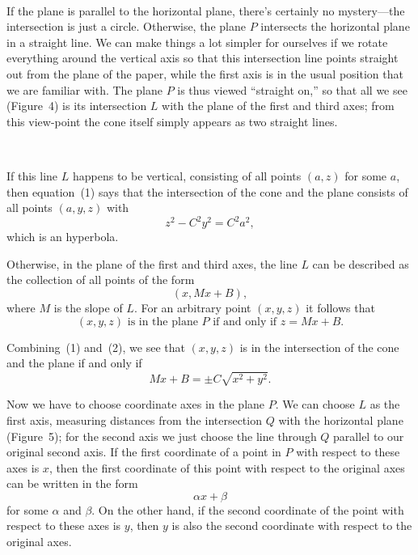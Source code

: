 \begin{center}
\\[0.6em]
\end{center}

If the plane is parallel to the horizontal plane, there's certainly no
mystery---the intersection is just a circle. Otherwise, the plane $P$
intersects the horizontal plane in a straight line. We can make things a lot
simpler for ourselves if we rotate everything around the vertical axis so that
this intersection line points straight out from the plane of the paper, while
the first axis is in the usual position that we are familiar with. The plane
$P$ is thus viewed ``straight on,'' so that all we see (Figure~4) is its
intersection $L$ with the plane of the first and third axes; from this
view-point the cone itself simply appears as two straight lines.

\begin{center}
\\[0.6em]
\end{center}

If this line $L$ happens to be vertical, consisting of all points $(a,z)$ for
some $a$, then equation~(1) says that the intersection of the cone and the
plane consists of all points $(a,y,z)$ with
\[
z^2-C^2y^2=C^2a^2,
\]
which is an hyperbola.

Otherwise, in the plane of the first and third axes, the line $L$ can be
described as the collection of all points of the form
\[
(x,Mx+B),
\]
where $M$ is the slope of $L$. For an arbitrary point $(x,y,z)$ it follows that
\begin{equation}
(x,y,z)\text{ is in the plane }P\text{ if and only if }z=Mx+B.\tag{2}
\end{equation}

Combining~(1) and~(2), we see that $(x,y,z)$ is in the intersection of the cone
and the plane if and only if
\begin{equation}
Mx+B=\pm C\sqrt{x^2+y^2}.\tag{$*$}
\end{equation}

Now we have to choose coordinate axes in the plane $P$. We can choose $L$ as
the first axis, measuring distances from the intersection $Q$ with the
horizontal plane (Figure~5); for the second axis we just choose the line
through $Q$ parallel to our original second axis. If the first coordinate of a
point in $P$ with respect to these axes is $x$, then the first coordinate of
this point with respect to the original axes can be written in the form
\[
\alpha x+\beta
\]
for some $\alpha$ and $\beta$. On the other hand, if the second coordinate of
the point with respect to these axes is $y$, then $y$ is also the second
coordinate with respect to the original axes.

